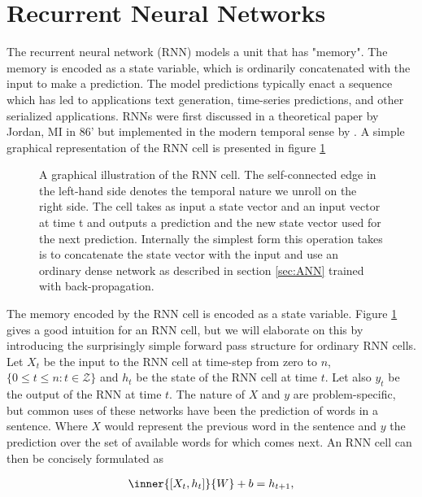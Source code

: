 
\section{Recurrent Neural Networks}\label{sec:rnn}

The recurrent neural network (RNN) models a unit that has "memory". The memory is encoded as a state variable, which is ordinarily concatenated with the input to make a prediction. The model predictions typically enact a sequence which has led to applications text generation, time-series predictions, and other serialized applications. RNNs were first discussed in a theoretical paper by Jordan, MI in 86' but implemented in the modern temporal sense by \citet{Pearlmutter1989}. A simple graphical representation of the RNN cell is presented in figure \ref{fig:rnn}

\begin{figure}[h]
\centering
{} %

\caption[Recurrent neural network cell]{A graphical illustration of the RNN cell. The self-connected edge in the left-hand side denotes the temporal nature we unroll on the right side. The cell takes as input a state vector and an input vector at time t and outputs a prediction and the new state vector used for the next prediction. Internally the simplest form this operation takes is to concatenate the state vector with the input and use an ordinary dense network as described in section \ref{sec:ANN} trained with back-propagation.}\label{fig:rnn}
\end{figure}

The memory encoded by the RNN cell is encoded as a state variable. Figure \ref{fig:rnn} gives a good intuition for an RNN cell, but we will elaborate on this by introducing the surprisingly simple forward pass structure for ordinary RNN cells. Let $X_t$ be the input to the RNN cell at time-step from zero to $n$, $\{0 \leq t \leq n: t \in \mathcal{Z} \}$ and $h_t$ be the state of the RNN cell at time $t$. Let also $y_t$ be the output of the RNN at time $t$. The nature of $X$ and $y$ are problem-specific, but common uses of these networks have been the prediction of words in a sentence. Where $X$ would represent the previous word in the sentence and $y$ the prediction over the set of available words for which comes next. An RNN cell can then be concisely formulated as

\begin{align}\label{eq:rnn}
\inner{[X_t, h_t]}{W} + b = h_{t+1},
\end{align}

